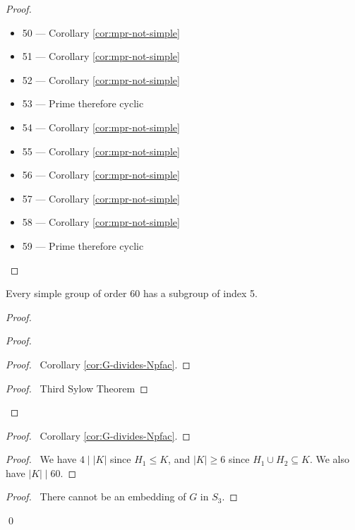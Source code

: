 \begin{proof}
\begin{itemize}
\item 50 --- Corollary \ref{cor:mpr-not-simple}
\item 51 --- Corollary \ref{cor:mpr-not-simple}
\item 52 --- Corollary \ref{cor:mpr-not-simple}
\item 53 --- Prime therefore cyclic
\item 54 --- Corollary \ref{cor:mpr-not-simple}
\item 55 --- Corollary \ref{cor:mpr-not-simple}
\item 56 --- Corollary \ref{cor:mpr-not-simple}
\item 57 --- Corollary \ref{cor:mpr-not-simple}
\item 58 --- Corollary \ref{cor:mpr-not-simple}
\item 59 --- Prime therefore cyclic
\end{itemize}
\end{proof}

\begin{prop}
Every simple group of order 60 has a subgroup of index 5.
\end{prop}

\begin{proof}
\pf
{}
\begin{proof}
	\begin{proof}
		\pf\ Corollary \ref{cor:G-divides-Npfac}.
	\end{proof}
	\begin{proof}
		\pf\ Third Sylow Theorem
	\end{proof}
\end{proof}
\begin{proof}
	\pf\ Corollary \ref{cor:G-divides-Npfac}.
\end{proof}
\begin{proof}
	\pf\ We have $4 \mid |K|$ since $H_1 \leq K$, and $|K| \geq 6$ since $H_1 \cup H_2 \subseteq K$. We also have $|K| \mid 60$.
\end{proof}
\begin{proof}
	\pf\ There cannot be an embedding of $G$ in $S_3$.
\end{proof}
\qed 
\end{proof}

